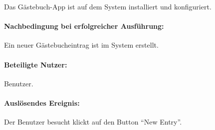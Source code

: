 Das Gästebuch-App ist auf dem System installiert und konfiguriert.

\paragraph{Nachbedingung bei erfolgreicher Ausführung:}

\begin{asparaitem}
\item Ein neuer Gästebucheintrag ist im System erstellt.
\end{asparaitem}

\paragraph{Beteiligte Nutzer:}

\begin{asparaitem}
\item Benutzer.
\end{asparaitem}

\paragraph{Auslösendes Ereignis:}

\begin{asparaitem}
\item Der Benutzer besucht klickt auf den Button ``New Entry''.
\end{asparaitem}

